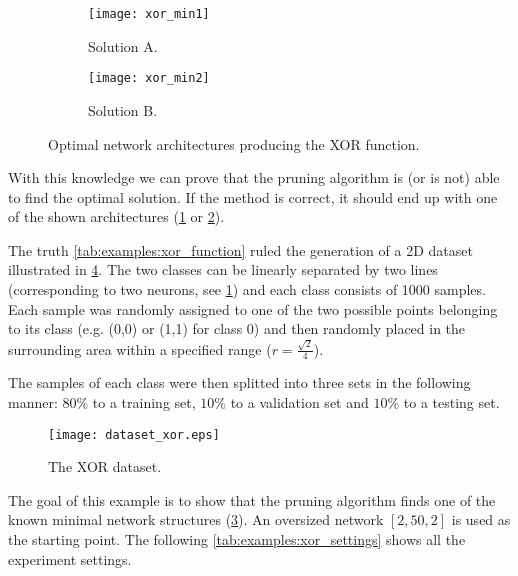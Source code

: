 \begin{figure}[H]
\centering
\begin{subfigure}{.4\textwidth}
  \centering
  \texttt{[image: xor\_min1]}
  \caption{Solution A.}
  \label{fig:examples:xor_min1}
\end{subfigure}
\begin{subfigure}{.4\textwidth}
  \centering
  \texttt{[image: xor\_min2]}
  \caption{Solution B.}
  \label{fig:examples:xor_min2}
\end{subfigure}
\caption{Optimal network architectures producing the XOR function.}
\label{fig:examples:xor_solutions}
\end{figure}

With this knowledge we can prove that the pruning algorithm is (or is not) able to find the optimal solution. If the method is correct, it should end up with one of the shown architectures (\cref{fig:examples:xor_min1} or \cref{fig:examples:xor_min2}).

The truth \cref{tab:examples:xor_function} ruled the generation of a 2D dataset illustrated in \cref{fig:examples:dataset_xor}. The two classes can be linearly separated by two lines (corresponding to two neurons, see \cref{fig:examples:xor_min1}) and each class consists of 1000 samples. Each sample was randomly assigned to one of the two possible points belonging to its class (e.g. (0,0) or (1,1) for class 0) and then randomly placed in the surrounding area within a specified range ($ r = \frac{\sqrt{2}}{4} $).

The samples of each class were then splitted into three sets in the following manner: $ 80\% $ to a training set, $ 10\% $ to a validation set and $ 10\% $ to a testing set.

\begin{figure}[H]
\centering
\texttt{[image: dataset\_xor.eps]}
\caption{The XOR dataset.}
\label{fig:examples:dataset_xor}
\end{figure}

The goal of this example is to show that the pruning algorithm finds one of the known minimal network structures (\cref{fig:examples:xor_solutions}). An oversized network $ [2, 50, 2] $ is used as the starting point. The following \cref{tab:examples:xor_settings} shows all the experiment settings.

